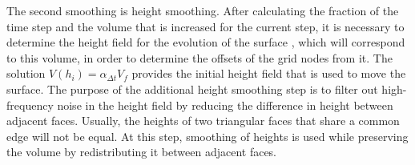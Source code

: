 The second smoothing is height smoothing.
After calculating the fraction of the time step and the volume that is increased for the current step, it is necessary to determine the height field for the evolution of the surface , which will correspond to this volume, in order to determine the offsets of the grid nodes from it.
The solution $V(h_i) = \alpha_{\Delta t} V_f$ provides the initial height field that is used to move the surface.
The purpose of the additional height smoothing step is to filter out high-frequency noise in the height field by reducing the difference in height between adjacent faces.
Usually, the heights of two triangular faces that share a common edge will not be equal.
At this step, smoothing of heights is used while preserving the volume by redistributing it between adjacent faces.

